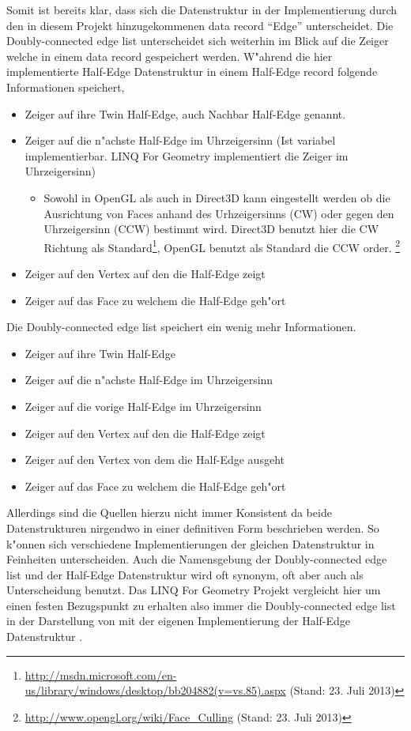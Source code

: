 \documentclass[pagesize, paper=a4, fontsize=12pt,titlepage=true, headings=small, headnosepline, abstractoff, liststotoc, nochapterprefix, plainheadsepline]{scrreprt}
\newcommand{\LFGS}{LINQ For Geometry }
\newcommand{\HES}{Half-Edge Datenstruktur }
\begin{document}
Somit ist bereits klar, dass sich die Datenstruktur in der Implementierung durch den in diesem Projekt hinzugekommenen data record "`Edge"' unterscheidet. Die Doubly-connected edge list unterscheidet sich weiterhin im Blick auf die Zeiger welche in einem data record gespeichert werden. W"ahrend die hier implementierte \HES in einem Half-Edge record folgende Informationen speichert,
\begin{itemize}
\item Zeiger auf ihre Twin Half-Edge, auch Nachbar Half-Edge genannt.
\item Zeiger auf die n"achste Half-Edge im Uhrzeigersinn (Ist variabel implementierbar. \LFGS implementiert die Zeiger im Uhrzeigersinn)
\begin{itemize}
\item Sowohl in OpenGL als auch in Direct3D kann eingestellt werden ob die Ausrichtung von Faces anhand des Urhzeigersinns (CW) oder gegen den Uhrzeigersinn (CCW) bestimmt wird. Direct3D benutzt hier die CW Richtung als Standard\footnote{\url{http://msdn.microsoft.com/en-us/library/windows/desktop/bb204882(v=vs.85).aspx} (Stand: 23. Juli 2013)}, OpenGL benutzt als Standard die CCW order. \footnote{\url{http://www.opengl.org/wiki/Face_Culling} (Stand: 23. Juli 2013)}
\end{itemize}
\item Zeiger auf den Vertex auf den die Half-Edge zeigt
\item Zeiger auf das Face zu welchem die Half-Edge geh"ort
\end{itemize}

Die Doubly-connected edge list speichert ein wenig mehr Informationen.
\begin{itemize}
\item Zeiger auf ihre Twin Half-Edge
\item Zeiger auf die n"achste Half-Edge im Uhrzeigersinn
\item Zeiger auf die vorige Half-Edge im Uhrzeigersinn
\item Zeiger auf den Vertex auf den die Half-Edge zeigt
\item Zeiger auf den Vertex von dem die Half-Edge ausgeht
\item Zeiger auf das Face zu welchem die Half-Edge geh"ort
\end{itemize}

Allerdings sind die Quellen hierzu nicht immer Konsistent da beide Datenstrukturen nirgendwo in einer definitiven Form beschrieben werden. So k"onnen sich verschiedene Implementierungen der gleichen Datenstruktur in Feinheiten unterscheiden. Auch die Namensgebung der Doubly-connected edge list und der \HES wird oft synonym, oft aber auch als Unterscheidung benutzt. Das \LFGS Projekt vergleicht hier um einen festen Bezugspunkt zu erhalten also immer die Doubly-connected edge list in der Darstellung von \cite[S.~30 und Folgende]{vanMarkdeBerg.2008} mit der eigenen Implementierung der \HES.
\end{document}
